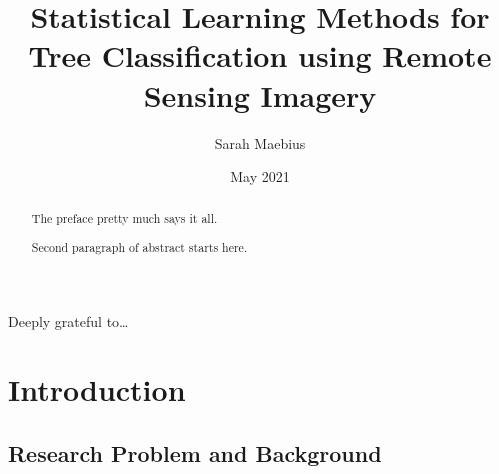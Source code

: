 \documentclass[12pt,twoside]{reedthesis}
\title{Statistical Learning Methods for Tree Classification using Remote Sensing Imagery}
\author{Sarah Maebius}
\date{May 2021}
\begin{document}
  \maketitle

\frontmatter %
\pagestyle{empty} %
  \begin{acknowledgements}
    Deeply grateful to\ldots{}
  \end{acknowledgements}

  \hypersetup{linkcolor=black}
  \setcounter{tocdepth}{2}
  \tableofcontents

  \listoftables

  \listoffigures
  \begin{abstract}
    The preface pretty much says it all.
    
    \par
    
    Second paragraph of abstract starts here.
  \end{abstract}

\mainmatter %
\pagestyle{fancyplain} %

\hypertarget{introduction}{%
\chapter*{Introduction}\label{introduction}}

\clearpage

\hypertarget{research-problem-and-background}{%
\section{Research Problem and Background}\label{research-problem-and-background}}
\end{document}
